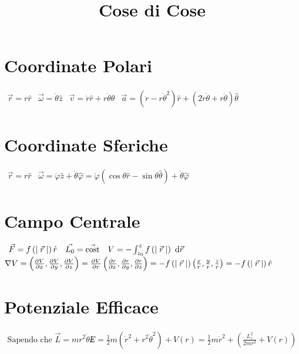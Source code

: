 \documentclass[a4paper,NoNotes,GeneralMath,12pt]{stdmdoc}
\newcommand\cost{\text{cost}}
\begin{document}
	\title{Cose di Cose}
	
	\section*{Coordinate Polari}
	$\begin{array}{cccc} \vec{r} = r\hat{r} & \vec{\omega} = \dot{\theta} \hat{z} & \vec{v} = \dot{r}\hat{r} + r\dot{\theta}\hat{\theta} & \vec{a} = \left(\ddot{r} - r{\dot{\theta}}^2\right)\hat{r} + \left(2\dot{r}\dot{\theta} + r\ddot{\theta}\right)\hat{\theta} \end{array}$

	\section*{Coordinate Sferiche}
	$\begin{array}{cc} \vec{r} = r\hat{r} & \vec{\omega} = \dot\varphi \hat{z} + \dot\theta \hat\varphi = \dot{\varphi} \left(\cos\theta \hat{r} - \sin\theta \hat{\theta}\right) + \dot{\theta} \hat{\varphi} \end{array}$

	\section*{Campo Centrale}
	$\begin{array}{ccc} \vec{F} = f\left(\mid \vec{r} \mid\right) \hat{r} & \vec{L_0} = \vec{\cost} & V = - \int_{z_0}^{z} f\left(\mid \vec{r} \mid\right) \de{\vec{r}} \end{array}$ \\ 
	$\nabla V = \left(\dpar{V}{x}, \dpar{V}{y}, \dpar{V}{z}\right) = \dpar{V}{r} \left(\dpar{r}{x}, \dpar{r}{y}, \dpar{r}{z}\right) = - f\left(\mid \vec{r} \mid\right) \left(\frac{x}{r}, \frac{y}{r}, \frac{z}{r}\right) = - f\left(\mid \vec{r} \mid \right) \hat{r}$

	\section*{Potenziale Efficace}
	$\begin{array}{cc} \text{Sapendo che } \vec{L} = mr^2 \dot{\theta} \hat{z} & E = \frac{1}{2} m\left({\dot{r}}^2 + r^2 {\dot{\theta}}^2\right) + V\left(r\right) = \frac{1}{2} m {\dot{r}}^2 + \left(\frac{L_z^2}{2mr^2} + V\left(r\right)\right) \end{array}$
\end{document}
